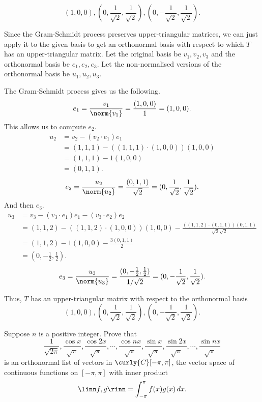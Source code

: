 \documentclass[12pt, letterpaper]{hmcpset}
\begin{document}
\begin{solution}
	\[
		\boxed{
			(1, 0, 0), (0, \frac{1}{\sqrt 2}, \frac{1}{\sqrt 2}), (0, -\frac{1}{\sqrt 2}, \frac{1}{\sqrt 2}).
		}
	\] 

	Since the Gram-Schmidt process preserves upper-triangular matrices, we can just apply it to the given basis to get an orthonormal basis with respect to which $T$ has an upper-triangular matrix. Let the original basis be $v_1, v_2, v_3$ and the orthonormal basis be $e_1, e_2, e_3$. Let the non-normalised versions of the orthonormal basis be $u_1, u_2, u_3$.

	The Gram-Schmidt process gives us the following.
	\[
		e_1 = \frac{v_1}{\norm{v_1}} = \frac{(1, 0, 0)}{1} = (1, 0, 0).
	\]
	This allows us to compute $e_2$.
	\[
		\begin{split}
			u_2 & = v_2 - (v_2 \cdot e_1) e_1 \\
			    & = (1, 1, 1) - ((1, 1, 1) \cdot (1, 0, 0)) (1, 0, 0) \\
			    & = (1, 1, 1) - 1(1, 0, 0) \\ 
			    & = (0, 1, 1).
		\end{split}
	\]
	\[
		e_2 = \frac{u_2}{\norm{u_2}} = \frac{(0, 1, 1)}{\sqrt{2}} = (0, \frac{1}{\sqrt 2}, \frac{1}{\sqrt 2}).
	\]
	And then $e_3$.
	\[
		\begin{split}
			u_3 & = v_3 - (v_3 \cdot e_1)e_1 - (v_3 \cdot e_2)e_2 \\ 
			    & = (1, 1, 2) - ((1, 1, 2) \cdot (1, 0, 0))(1, 0, 0) - \frac{((1, 1, 2) \cdot (0, 1, 1))(0, 1, 1)}{\sqrt{2} \sqrt{2}} \\
			    & = (1, 1, 2) - 1(1, 0, 0) - \frac{3(0, 1, 1)}{2} \\
			    & = (0, -\frac{1}{2}, \frac{1}{2}).
		\end{split}
	\]
	\[
		e_3 = \frac{u_3}{\norm{u_3}} = \frac{(0, -\frac{1}{2}, \frac{1}{2})}{1 / \sqrt{2}} = (0, -\frac{1}{\sqrt 2}, \frac{1}{\sqrt 2}).
	\]

	Thus, $T$ has an upper-triangular matrix with respect to the orthonormal basis
	\[
		(1, 0, 0), (0, \frac{1}{\sqrt 2}, \frac{1}{\sqrt 2}), (0, -\frac{1}{\sqrt 2}, \frac{1}{\sqrt 2}).
	\]
\end{solution}

\pagebreak

\begin{problem}[4]
	Suppose $n$ is a positive integer. Prove that
	\[
		\frac{1}{\sqrt{2 \pi}}, \frac{\cos{x}}{\sqrt{\pi}}, \frac{\cos{2x}}{\sqrt{\pi}}, \cdots, \frac{\cos{nx}}{\sqrt{\pi}}, \frac{\sin{x}}{\sqrt{\pi}}, \frac{\sin{2x}}{\sqrt{\pi}}, \cdots, \frac{\sin{nx}}{\sqrt{\pi}}
	\]
	is an orthonormal list of vectors in $\curly{C}[-\pi, \pi]$, the vector space of continuous functions on $[-\pi, \pi]$ with inner product
	\[
		\linn f, g \rinn =  \int_{-\pi}^{\pi} f(x) g(x) \, dx.
	\]
\end{problem}
\end{document}
